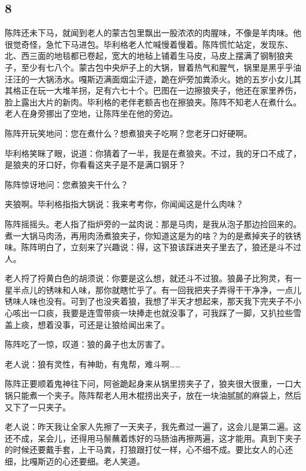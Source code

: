 \subsection*{8}


\par 陈阵还未下马，就闻到老人的蒙古包里飘出一股浓浓的肉腥味，不像是羊肉味。他很觉奇怪，急忙下马进包。毕利格老人忙喊慢着慢着。陈阵慌忙站定，发现东、北、西三面的地毯都已卷起，宽大的地毡上铺着生马皮，马皮上摆满了钢制狼夹子，至少有七八个。蒙古包中央炉子上的大锅，冒着热气和腥气，锅里是黑乎乎油汪汪的一大锅汤水。嘎斯迈满面烟尘汗迹，跪在炉旁加粪添火。她的五岁小女儿其其格正在玩一大堆羊拐，足有六七十个。巴图在一边擦狼夹子，他还在家里养伤，脸上露出大片的新肉。毕利格的老伴老额吉也在擦狼夹。陈阵不知老人在煮什么。老人在身旁挪出了空地，让陈阵坐在他的旁边。
\par 陈阵开玩笑地问：您在煮什么？想煮狼夹子吃啊？您老牙口好硬啊。
\par 毕利格笑眯了眼，说道：你猜着了一半，我是在煮狼夹。不过，我的牙口不成了，是狼夹的牙口好，你看看这夹子是不是满口钢牙？
\par 陈阵惊讶地问：您煮狼夹干什么？
\par 夹狼啊。毕利格指指大锅说：我来考考你，你闻闻这是什么肉味？
\par 陈阵摇摇头。老人指了指炉旁的一盆肉说：那是马肉，是我从泡子那边捡回来的。煮一大锅马肉汤，再用肉汤煮狼夹子，你知道这是为的啥？为的是煮掉夹子的铁锈味。陈阵明白了，立刻来了兴趣说：得，这下狼该踩进夹子里去了，狼还是斗不过人。
\par 老人捋了捋黄白色的胡须说：你要是这么想，就还斗不过狼。狼鼻子比狗灵，有一星半点儿的锈味和人味，那你就瞎忙乎了。有一回我把夹子弄得干干净净，一点儿锈味人味也没有。可到了也没夹着狼，我想了半天才想起来，那天我下完夹子不小心咳出一口痰，我要是连雪带痰一块捧走也就没事了，可我踩了一脚，又扒拉些雪盖上痰，想着没事，可还是让狼给闻出来了。
\par 陈阵吃了一惊，叹道：狼的鼻子也太厉害了。
\par 老人说：狼有灵性，有神助，有鬼帮，难斗啊……
\par 陈阵正要顺着鬼神往下问，阿爸跪起身来从锅里捞夹子了，狼夹很大很重，一口大锅只能煮一个夹子。陈阵帮老人用木棍捞出夹子，放在一块油腻腻的麻袋上，然后又下了一只夹子。
\par 老人说：昨天我让全家人先擦了一天夹子，我先煮过一遍了，这会儿是第二遍。这还不成，呆会儿，还得用马鬃蘸着炼好的马肠油再擦两遍，这才能用。真到下夹子的时候还要戴手套，上干马粪，打狼跟打仗一样，心不细不成。要比女人的心还细，比嘎斯迈的心还要细。老人笑道。
